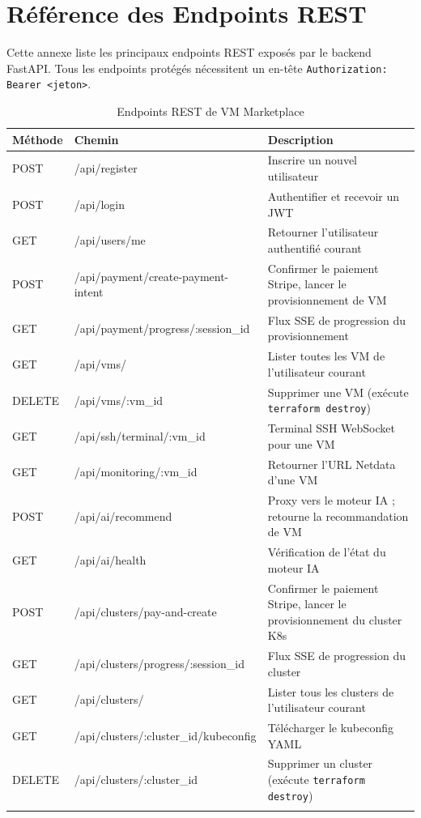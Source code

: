 \chapter{Référence des Endpoints REST}
\label{app:api}

Cette annexe liste les principaux endpoints REST exposés par le backend FastAPI.
Tous les endpoints protégés nécessitent un en-tête
\texttt{Authorization: Bearer <jeton>}.

\begin{longtable}{llX}
\toprule
\textbf{Méthode} & \textbf{Chemin} & \textbf{Description} \\
\midrule
\endhead
POST & /api/register & Inscrire un nouvel utilisateur \\
POST & /api/login & Authentifier et recevoir un JWT \\
GET  & /api/users/me & Retourner l'utilisateur authentifié courant \\
\midrule
POST & /api/payment/create-payment-intent & Confirmer le paiement Stripe, lancer le provisionnement de VM \\
GET  & /api/payment/progress/:session\_id & Flux SSE de progression du provisionnement \\
\midrule
GET  & /api/vms/ & Lister toutes les VM de l'utilisateur courant \\
DELETE & /api/vms/:vm\_id & Supprimer une VM (exécute \texttt{terraform destroy}) \\
\midrule
GET  & /api/ssh/terminal/:vm\_id & Terminal SSH WebSocket pour une VM \\
GET  & /api/monitoring/:vm\_id & Retourner l'URL Netdata d'une VM \\
\midrule
POST & /api/ai/recommend & Proxy vers le moteur IA ; retourne la recommandation de VM \\
GET  & /api/ai/health & Vérification de l'état du moteur IA \\
\midrule
POST & /api/clusters/pay-and-create & Confirmer le paiement Stripe, lancer le provisionnement du cluster K8s \\
GET  & /api/clusters/progress/:session\_id & Flux SSE de progression du cluster \\
GET  & /api/clusters/ & Lister tous les clusters de l'utilisateur courant \\
GET  & /api/clusters/:cluster\_id/kubeconfig & Télécharger le kubeconfig YAML \\
DELETE & /api/clusters/:cluster\_id & Supprimer un cluster (exécute \texttt{terraform destroy}) \\
\bottomrule
\caption{Endpoints REST de VM Marketplace}
\label{tab:api_endpoints}
\end{longtable}
